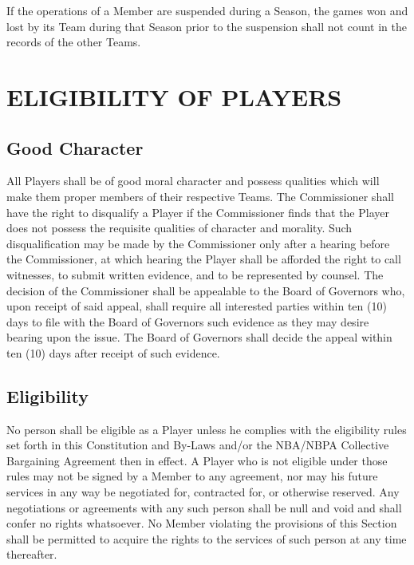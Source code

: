 \documentclass[]{book}
\begin{document}
If the operations of a Member are suspended during a Season, the games won and lost by its Team during that Season prior to the suspension shall not count in the records of the other Teams.

\hypertarget{eligibility-of-players}{%
\section{ELIGIBILITY OF PLAYERS}\label{eligibility-of-players}}

\hypertarget{good-character}{%
\subsection{Good Character}\label{good-character}}

All Players shall be of good moral character and possess qualities which will make them proper members of their respective Teams. The Commissioner shall have the right to disqualify a Player if the Commissioner finds that the Player does not possess the requisite qualities of character and morality. Such disqualification may be made by the Commissioner only after a hearing before the Commissioner, at which hearing the Player shall be afforded the right to call witnesses, to submit written evidence, and to be represented by counsel. The decision of the Commissioner shall be appealable to the Board of Governors who, upon receipt of said appeal, shall require all interested parties within ten (10) days to file with the Board of Governors such evidence as they may desire bearing upon the issue. The Board of Governors shall decide the appeal within ten (10) days after receipt of such evidence.

\hypertarget{eligibility}{%
\subsection{Eligibility}\label{eligibility}}

No person shall be eligible as a Player unless he complies with the eligibility rules set forth in this Constitution and By-Laws and/or the NBA/NBPA Collective Bargaining Agreement then in effect. A Player who is not eligible under those rules may not be signed by a Member to any agreement, nor may his future services in any way be negotiated for, contracted for, or otherwise reserved. Any negotiations or agreements with any such person shall be null and void and shall confer no rights whatsoever. No Member violating the provisions of this Section shall be permitted to acquire the rights to the services of such person at any time thereafter.
\end{document}
